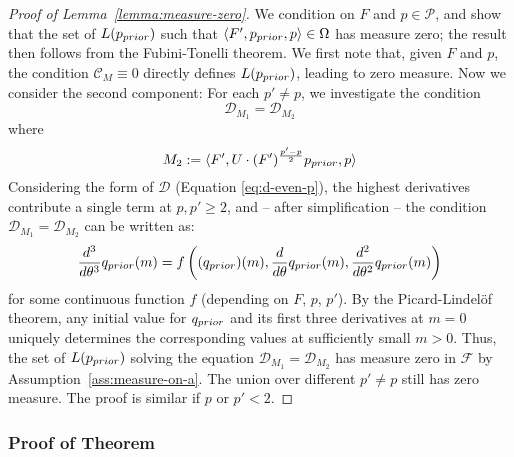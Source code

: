 \begin{proof}[Proof of Lemma~\ref{lemma:measure-zero}]
We condition on $F$ and $p \in \mathcal{P}$, and show that the set of $L(p_{prior})$ such that $\langle F', p_{prior}, p\rangle \in \Omega$ has measure zero; the result then follows from the Fubini-Tonelli theorem. 
We first note that, given $F$ and $p$, the condition $\mathcal{C}_M \equiv 0$ directly defines $L(p_{prior})$, leading to zero measure.
Now we consider the second component: For each $p' \neq p$, we investigate the condition
\begin{equation}
    \mathcal{D}_{M_1} = \mathcal{D}_{M_2}
\end{equation}
where 
\begin{equation}
    M_2 := \langle F', U \cdot (F')^{\frac{p'-p}{2}} p_{prior}, p\rangle
\end{equation}
Considering the form of $\mathcal{D}$ (Equation \ref{eq:d-even-p}), the highest derivatives contribute a single term at $p,p'\geq 2$, and -- after simplification -- the condition $\mathcal{D}_{M_1} = \mathcal{D}_{M_2}$ can be written as:
\begin{equation}
     \frac{d^3}{d\theta^3} q_{prior}(m)  = f\left((q_{prior})(m), \frac{d}{d\theta} q_{prior}(m), \frac{d^2}{d\theta^2} q_{prior}(m)\right)
\end{equation}
for some continuous function $f$ (depending on $F$, $p$, $p'$).
By the Picard-Lindel{\"o}f theorem, any initial value for $q_{prior}$ and its first three derivatives at $m = 0$ uniquely determines the corresponding values at sufficiently small $m>0$. Thus, the set of $L(p_{prior})$ solving the equation $\mathcal{D}_{M_1} = \mathcal{D}_{M_2}$ has measure zero in $\mathcal{F}$ by Assumption~\ref{ass:measure-on-a}.
The union over different $p' \neq p$ still has zero measure.
The proof is similar if $p$ or $p' < 2$.



\end{proof}


\subsubsection{Proof of Theorem}


